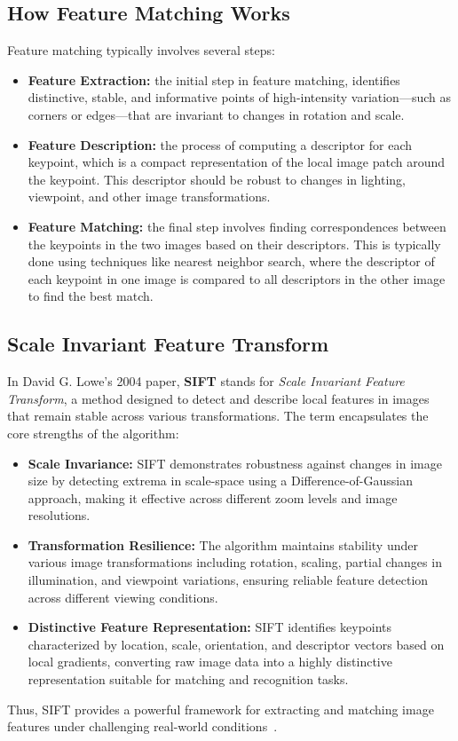 \subsection{How Feature Matching Works}
Feature matching typically involves several steps:
\begin{itemize}
    \item \textbf{Feature Extraction:} the initial step in feature matching, identifies distinctive, stable, and informative points of high-intensity variation—such as corners or edges—that are invariant to changes in rotation and scale.
    \item \textbf{Feature Description:} the process of computing a descriptor for each keypoint, which is a compact representation of the local image patch around the keypoint. This descriptor should be robust to changes in lighting, viewpoint, and other image transformations.
    \item \textbf{Feature Matching:} the final step involves finding correspondences between the keypoints in the two images based on their descriptors. This is typically done using techniques like nearest neighbor search, where the descriptor of each keypoint in one image is compared to all descriptors in the other image to find the best match.
\end{itemize}
\subsection{Scale Invariant Feature Transform}
In David G. Lowe’s 2004 paper, \textbf{SIFT} stands for \textit{Scale Invariant Feature Transform}, a method designed to detect and describe local features in images that remain stable across various transformations. The term encapsulates the core strengths of the algorithm:
\begin{itemize}
    \item \textbf{Scale Invariance:} SIFT demonstrates robustness against changes in image size by detecting extrema in scale-space using a Difference-of-Gaussian approach, making it effective across different zoom levels and image resolutions.
    
    \item \textbf{Transformation Resilience:} The algorithm maintains stability under various image transformations including rotation, scaling, partial changes in illumination, and viewpoint variations, ensuring reliable feature detection across different viewing conditions.
    
    \item \textbf{Distinctive Feature Representation:} SIFT identifies keypoints characterized by location, scale, orientation, and descriptor vectors based on local gradients, converting raw image data into a highly distinctive representation suitable for matching and recognition tasks.
\end{itemize}
Thus, SIFT provides a powerful framework for extracting and matching image features under challenging real-world conditions~\cite{lowe2004}.

